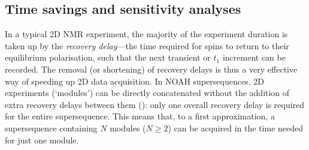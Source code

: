 \subsection{Time savings and sensitivity analyses}
\label{subsec:noah__snr}

In a typical 2D NMR experiment, the majority of the experiment duration is taken up by the \textit{recovery delay}---the time required for spins to return to their equilibrium polarisation, such that the next transient or $t_1$ increment can be recorded.
The removal (or shortening) of recovery delays is thus a very effective way of speeding up 2D data acquisition.
In NOAH supersequences, 2D experiments (`modules') can be directly concatenated without the addition of extra recovery delays between them (): only one overall recovery delay is required for the entire supersequence.
This means that, to a first approximation, a supersequence containing $N$ modules ($N \geq 2$) can be acquired in the time needed for just one module.

